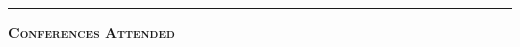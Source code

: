 \documentclass[12pt]{article}
\newcommand{\sectionheading}[1]
{
\bigskip %
\noindent
\hspace{-6.5mm}\textcolor{Gray}{\rule[.75mm]{21.5mm}{1mm}} %
\hspace{.2mm}	%
{\large{\textbf{\textsc{#1}}}} %
}
\newenvironment{date_section}
	{
	\vspace{-1ex}
	\leftmargini = 15ex
		\begin{itemize}[
			labelsep = *,
			labelwidth = 9ex,
			labelindent = 0ex,
			itemindent = !,
			font=\normalfont,
			align=parleft
		]{}
		\itemsep=-1.5mm
	}
	{\end{itemize}\vspace{-2ex}}
\newcommand{\yearmo}[2]{
	\item[
		{\makebox[1ex][r]{#1}}
		\hspace{1ex}
		{\makebox[1ex][l]{#2} }
		] }
\begin{document}
\begin{date_section}
	\end{date_section}






%
%
%
%
%
%
%
%
%








	\sectionheading{Conferences Attended} %
\end{document}
